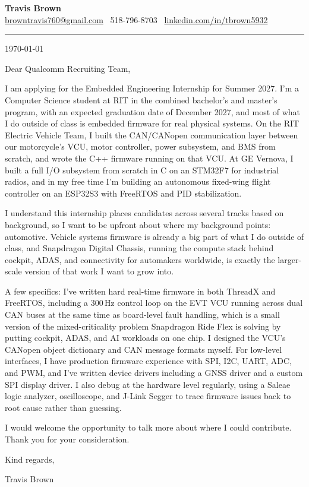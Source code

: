 \documentclass[11pt]{article}
\begin{document}
\begin{center}
  {\LARGE\textbf{Travis Brown}}\\[3pt]
  \href{mailto:browntravis760@gmail.com}{browntravis760@gmail.com} \textbullet\
  518-796-8703 \textbullet\
  \href{https://www.linkedin.com/in/tbrown5932}{linkedin.com/in/tbrown5932}
\end{center}

\vspace{2pt}
\noindent\rule{\linewidth}{0.5pt}
\vspace{10pt}

\begin{flushright}
  \today
\end{flushright}

\vspace{4pt}

Dear Qualcomm Recruiting Team,

I am applying for the Embedded Engineering Internship for Summer 2027. I'm a
Computer Science student at RIT in the combined bachelor's and master's
program, with an expected graduation date of December 2027, and most
of what I do outside of class is embedded firmware for real physical systems.
On the RIT Electric Vehicle Team, I built the CAN/CANopen communication layer
between our motorcycle's VCU, motor controller, power subsystem, and BMS from
scratch, and wrote the C++ firmware running on that VCU. At GE Vernova, I
built a full I/O subsystem from scratch in C on an STM32F7 for industrial
radios, and in my free time I'm building an autonomous fixed-wing flight
controller on an ESP32S3 with FreeRTOS and PID stabilization.

I understand this internship places candidates across several tracks based on
background, so I want to be upfront about where my background points:
automotive. Vehicle systems firmware is already a big part of what I do
outside of class, and Snapdragon Digital Chassis, running the compute stack
behind cockpit, ADAS, and connectivity for automakers worldwide, is exactly
the larger-scale version of that work I want to grow into.

A few specifics: I've written hard real-time firmware in both ThreadX and
FreeRTOS, including a 300\,Hz control loop on the EVT VCU running across dual
CAN buses at the same time as board-level fault handling, which is a small
version of the mixed-criticality problem Snapdragon Ride Flex is solving by
putting cockpit, ADAS, and AI workloads on one chip. I designed the VCU's
CANopen object dictionary and CAN message formats myself. For low-level
interfaces, I have production firmware
experience with SPI, I2C, UART, ADC, and PWM, and I've written device drivers
including a GNSS driver and a custom SPI display driver. I also debug at the
hardware level regularly, using a Saleae logic analyzer, oscilloscope, and
J-Link Segger to trace firmware issues back to root cause rather than
guessing.

I would welcome the opportunity to talk more about where I could contribute.
Thank you for your consideration.

\vspace{16pt}
Kind regards,

\vspace{20pt}
Travis Brown
\end{document}
